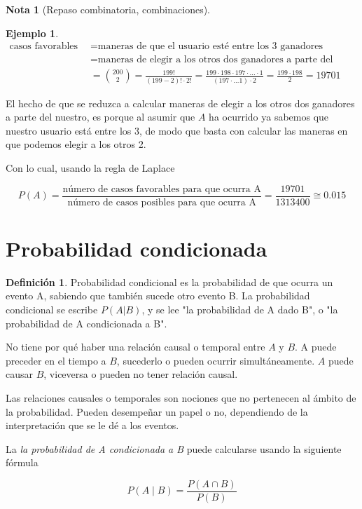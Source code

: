 \documentclass[]{book}
\theoremstyle{plain}
\theoremstyle{definition}
\newtheorem{definition}[theorem]{Definición}
\newtheorem{note}[theorem]{Nota}
\newtheorem{example}[theorem]{Ejemplo}
\theoremstyle{definition} %
\begin{document}
\begin{note}[Repaso combinatoria, combinaciones]
\begin{example}
\begin{align*}
  \text{casos favorables para A}&= \text{maneras de que el usuario esté entre los 3 ganadores}\\
  &= \text{maneras de elegir a los otros dos ganadores a parte del nuestro}\\
  &={200 \choose 2} = \frac{199!}{(199-2)! \cdot 2!} = \frac{199 \cdot 198 \cdot 197\cdot\ldots\cdot 1 }{(197 \cdot \ldots 1)\cdot 2} = \frac{199 \cdot 198}{2}= 19701
\end{align*}

El hecho de que se reduzca a calcular maneras de elegir a los otros dos ganadores a parte del nuestro, es porque al asumir que $A$ ha ocurrido ya sabemos que nuestro usuario
está entre los 3, de modo que basta con calcular las maneras en que podemos elegir a los otros 2.

Con lo cual, usando la regla de Laplace

\[P(A) = \frac{\text{número de casos favorables para que ocurra A}}{\text{número de casos posibles para que ocurra A}} = \frac{19701}{1313400}\cong 0.015\]

\end{example}

\end{note}


\section{Probabilidad condicionada}

\begin{definition}
  
Probabilidad condicional es la probabilidad de que ocurra un evento A, sabiendo que también sucede otro evento B. 
La probabilidad condicional se escribe $P(A|B)$, y se lee "la probabilidad de A dado B", o "la probabilidad de A condicionada a B".

No tiene por qué haber una relación causal o temporal entre $A$ y $B$. A puede preceder en el tiempo a $B$, 
sucederlo o pueden ocurrir simultáneamente. $A$ puede causar $B$, viceversa o pueden no tener relación causal. 

Las relaciones causales o temporales son nociones que no pertenecen al ámbito de la probabilidad. 
Pueden desempeñar un papel o no, dependiendo de la interpretación que se le dé a los eventos. 

La \emph{la probabilidad de A condicionada a B} puede calcularse usando la siguiente fórmula 

\begin{equation}\label{equ_condicionada}
  P(A\mid B)=\frac {P(A\cap B)}{P(B)} 
\end{equation}


\end{definition}
\end{document}
